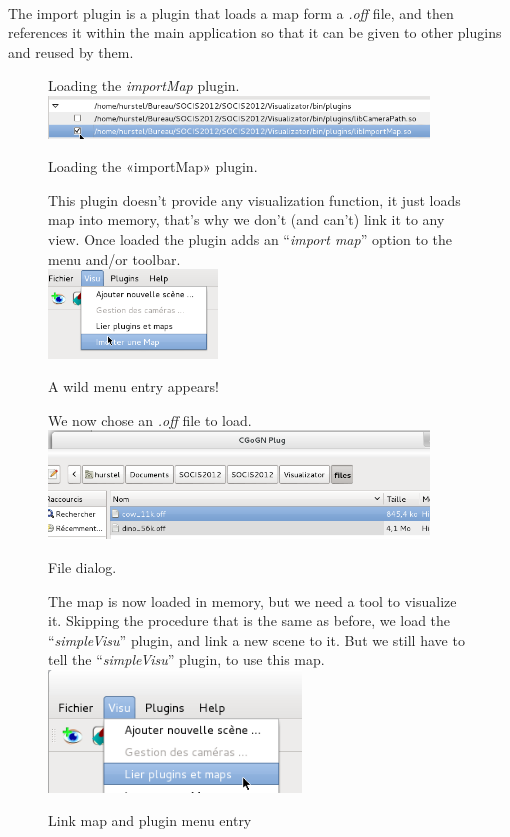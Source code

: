 \documentclass[a4paper]{scrreprt}
\begin{document}
	\paragraph{}
	The import plugin is a plugin that loads a map form a \textit{.off} file, and
	then references it within the main application so that it can be given to other
	plugins and reused by them.
	\begin{figure}[h!p]
		Loading the \textit{importMap} plugin.
	  \centering
	    \includegraphics[width=0.9\textwidth]{images/screenshot13}
	  \caption{Loading the «importMap» plugin.}		
	\end{figure}
	\begin{figure}[h!p]
		This plugin doesn't provide any visualization function, it just loads map into
		memory, that's why we don't (and can't) link it to any view. Once loaded the
		plugin adds an ``\textit{import map}'' option to the menu and/or toolbar.\\
	  \centering
	    \includegraphics[width=0.4\textwidth]{images/screenshot14}
	  \caption{A wild menu entry appears!}	
	\end{figure}
	\begin{figure}[h!p]
		We now chose an \textit{.off} file to load.\\
		\centering
	    \includegraphics[width=0.9\textwidth]{images/screenshot15}
	  \caption{File dialog.}			
	\end{figure}
	\begin{figure}[h!p]
		The map is now loaded in memory, but we need a tool to visualize it. Skipping
		the procedure that is the same as before, we load the ``\textit{simpleVisu}''
		plugin, and link a new scene to it. But we still have to tell the
		``\textit{simpleVisu}'' plugin, to use this map.\\
		\centering
		\includegraphics[width=0.6\textwidth]{images/screenshot16}
		\caption{Link map and plugin menu entry}
		\label{fig:linkMapPlugin}
	\end{figure}
\end{document}
